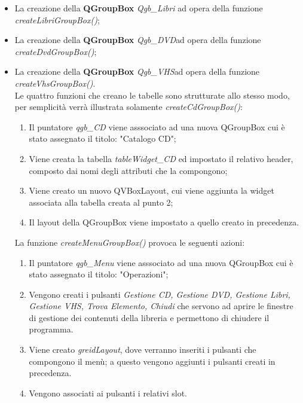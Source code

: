 {{\begin{itemize}
		\item La creazione della \textbf{QGroupBox} \textit{Qgb\_Libri} ad opera della funzione \textit{createLibriGroupBox()};
		\item La creazione della \textbf{QGroupBox} \textit{Qgb\_DVD}ad opera della funzione \textit{createDvdGroupBox()};
		\item La creazione della \textbf{QGroupBox} \textit{Qgb\_VHS}ad opera della funzione \textit{createVhsGroupBox()}.\\
		Le quattro funzioni che creano le tabelle sono strutturate allo stesso modo, per semplicità verrà illustrata solamente \textit{createCdGroupBox()}: 
		\begin{enumerate}
			\item Il puntatore \textit{qgb_CD} viene asssociato ad una nuova QGroupBox cui è stato assegnato il titolo: "Catalogo CD";
			\item Viene creata la tabella \textit{tableWidget_CD} ed impostato il relativo header, composto dai nomi degli attributi che la compongono;
			\item Viene creato un nuovo QVBoxLayout, cui viene aggiunta la widget associata alla tabella creata al punto 2;
			\item Il layout della QGroupBox viene impostato a quello creato in precedenza.
		\end{enumerate}
		La funzione \textit{createMenuGroupBox()} provoca le seguenti azioni:
		\begin{enumerate}
			\item Il puntatore \textit{qgb_Menu} viene asssociato ad una nuova QGroupBox cui è stato assegnato il titolo: "Operazioni";
			\item Vengono creati i pulsanti \textit{Gestione CD, Gestione DVD, Gestione Libri, Gestione VHS, Trova Elemento, Chiudi} che servono ad aprire le finestre di gestione dei contenuti della libreria e permettono di chiudere il programma.
			\item Viene creato \textit{greidLayout}, dove verranno inseriti i pulsanti che compongono il menù; a questo vengono aggiunti i pulsanti creati in precedenza.
			\item Vengono associati ai pulsanti i relativi slot.
		\end{enumerate}
	\end{itemize}
	}
}